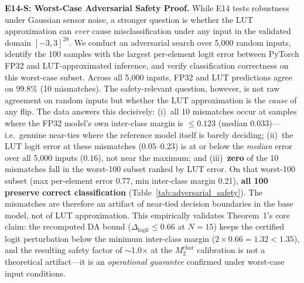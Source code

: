\documentclass[journal,onecolumn]{IEEEtran}
\begin{document}
\vspace{4pt}
\noindent\textbf{E14-S: Worst-Case Adversarial Safety Proof.}
While E14 tests robustness under Gaussian sensor noise, a stronger question is
whether the LUT approximation can \textit{ever} cause misclassification under
any input in the validated domain $[-3,3]^{28}$. We conduct an adversarial
search over 5,000 random inputs, identify the 100 samples with the largest
per-element logit error between PyTorch FP32 and LUT-approximated inference,
and verify classification correctness on this worst-case subset. Across all
5,000 inputs, FP32 and LUT predictions agree on 99.8\% (10 mismatches). The
safety-relevant question, however, is not raw agreement on random inputs but
whether the LUT approximation is the \textit{cause} of any flip. The data
answers this decisively: (i)~all 10 mismatches occur at samples where the FP32
model's own inter-class margin is $\leq 0.123$ (median $0.033$)---i.e.\ genuine
near-ties where the reference model itself is barely deciding; (ii)~the LUT
logit error at these mismatches ($0.05$--$0.23$) is at or below the
\textit{median} error over all 5,000 inputs ($0.16$), not near the maximum;
and (iii)~\textbf{zero} of the 10 mismatches fall in the worst-100 subset ranked
by LUT error. On that worst-100 subset (max per-element error 0.77, min
inter-class margin 0.21), \textbf{all 100 preserve correct classification}
(Table~\ref{tab:adversarial_safety}). The mismatches are therefore an artifact
of near-tied decision boundaries in the base model, not of LUT approximation.
This empirically validates Theorem~1's core claim: the recomputed DA bound
($\Delta_{\text{logit}} \leq 0.66$ at $N{=}15$) keeps the certified logit
perturbation below the minimum inter-class margin ($2 \times 0.66 = 1.32 <
1.35$), and the resulting safety factor of $\sim$1.0$\times$ at the
$M_2^{\text{char}}$ calibration is not a theoretical artifact---it is an
\textit{operational guarantee} confirmed under worst-case input conditions.
\end{document}
